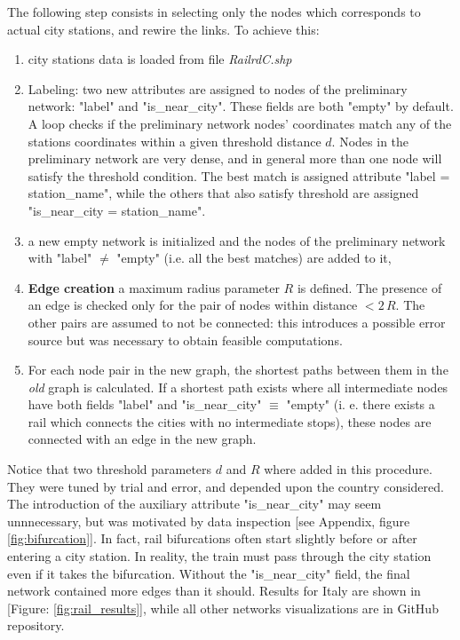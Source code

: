 \bigskip \newline 
The following step consists in selecting only the nodes which corresponds to actual city stations, and rewire the links. To achieve this:
\begin{enumerate}
    \item city stations data is loaded from file \textit{RailrdC.shp}
    \item Labeling: two new attributes are assigned to nodes of the preliminary network: "label" and "is\_near\_city". These fields are both "empty" by default.
    A loop checks if the preliminary network nodes' coordinates match any of the stations coordinates within a given threshold distance $d$. Nodes in the preliminary network are very dense, and in general more than one node will satisfy the threshold condition. The best match is assigned attribute "label = station\_name", while the others that also satisfy threshold are assigned "is\_near\_city = station\_name". 
    \item a new empty network is initialized and the nodes of the preliminary network with "label" $\neq$ "empty" (i.e. all the best matches) are added to it,
    \item \textbf{Edge creation} a maximum radius parameter $R$ is defined. The presence of an edge is checked only for the pair of nodes within distance $<2\,R$. The other pairs are assumed to not be connected: this introduces a possible error source but was necessary to obtain feasible computations.
    \item For each node pair in the new graph, the shortest paths between them in the \textit{old} graph is calculated. If a shortest path exists where all intermediate nodes have both fields "label" and "is\_near\_city" $\equiv$ "empty" (i. e. there exists a rail which connects the cities with no intermediate stops), these nodes are connected with an edge in the new graph.
\end{enumerate}
Notice that two threshold parameters $d$ and $R$ where added in this procedure. They were tuned by trial and error, and depended upon the country considered. The introduction of the auxiliary attribute "is\_near\_city" may seem unnnecessary, but was motivated by data inspection [see Appendix, figure \ref{fig:bifurcation}]. In fact, rail bifurcations often start slightly before or after entering a city station. In reality, the train must pass through the city station even if it takes the bifurcation. Without the "is\_near\_city" field, the final network contained more edges than it should. Results for Italy are shown in [Figure: \ref{fig:rail_results}], while all other networks visualizations are in GitHub repository.
